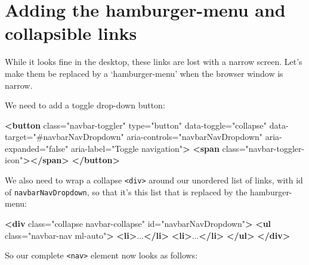 \documentclass[a4paperpaper,openright]{book}
\newenvironment{Shaded}{}{}
\newcommand{\KeywordTok}[1]{\textcolor[rgb]{0.00,0.44,0.13}{\textbf{#1}}}
\newcommand{\NormalTok}[1]{#1}
\newcommand{\OtherTok}[1]{\textcolor[rgb]{0.00,0.44,0.13}{#1}}
\newcommand{\StringTok}[1]{\textcolor[rgb]{0.25,0.44,0.63}{#1}}
\begin{document}
\hypertarget{adding-the-hamburger-menu-and-collapsible-links}{%
\section{Adding the hamburger-menu and collapsible
links}\label{adding-the-hamburger-menu-and-collapsible-links}}

While it looks fine in the desktop, these links are lost with a narrow
screen. Let's make them be replaced by a `hamburger-menu' when the
browser window is narrow.

We need to add a toggle drop-down button:

\begin{Shaded}
\begin{Highlighting}[]
    \KeywordTok{<button}\OtherTok{ class=}\StringTok{"navbar-toggler"}\OtherTok{ type=}\StringTok{"button"}\OtherTok{ data-toggle=}\StringTok{"collapse"}
\OtherTok{            data-target=}\StringTok{"#navbarNavDropdown"}\OtherTok{ aria-controls=}\StringTok{"navbarNavDropdown"}
\OtherTok{            aria-expanded=}\StringTok{"false"}\OtherTok{ aria-label=}\StringTok{"Toggle navigation"}\KeywordTok{>}
        \KeywordTok{<span}\OtherTok{ class=}\StringTok{"navbar-toggler-icon"}\KeywordTok{></span>}
    \KeywordTok{</button>}
\end{Highlighting}
\end{Shaded}

We also need to wrap a collapse \texttt{\textless{}div\textgreater{}}
around our unordered list of links, with id of
\texttt{navbarNavDropdown}, so that it's this list that is replaced by
the hamburger-menu:

\begin{Shaded}
\begin{Highlighting}[]
    \KeywordTok{<div}\OtherTok{ class=}\StringTok{"collapse navbar-collapse"}\OtherTok{ id=}\StringTok{"navbarNavDropdown"}\KeywordTok{>}
        \KeywordTok{<ul}\OtherTok{ class=}\StringTok{"navbar-nav ml-auto"}\KeywordTok{>}
            \KeywordTok{<li>}\NormalTok{...}\KeywordTok{</li>}
            \KeywordTok{<li>}\NormalTok{...}\KeywordTok{</li>}
        \KeywordTok{</ul>}
    \KeywordTok{</div>}
\end{Highlighting}
\end{Shaded}

So our complete \texttt{\textless{}nav\textgreater{}} element now looks
as follows:
\end{document}
